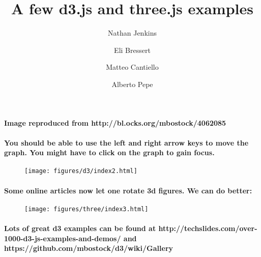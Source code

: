 \documentclass{emulateapj}
\begin{document}
\title{A few d3.js and three.js examples
}

\author{Nathan Jenkins}

\author{Eli Bressert}

\author{Matteo Cantiello}

\author{Alberto Pepe}

\maketitle

\paragraph{Image reproduced from http://bl.ocks.org/mbostock/4062085}

\paragraph{You should be able to use the left and right arrow keys to
move the graph. You might have to click on the graph to gain focus.}



\begin{figure}[tb]
\texttt{[image: figures/d3/index2.html]}
\caption{}
\end{figure}
\paragraph{Some online articles now let one rotate 3d figures. We can do
better:}



\begin{figure}[tb]
\texttt{[image: figures/three/index3.html]}
\caption{}
\end{figure}
\paragraph{Lots of great d3 examples can be found at
http://techslides.com/over-1000-d3-js-examples-and-demos/ and
https://github.com/mbostock/d3/wiki/Gallery}




\end{document}
